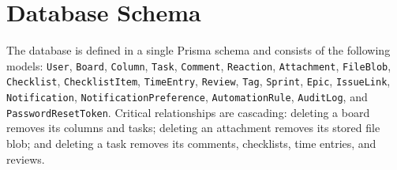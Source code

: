 \documentclass[12pt,a4paper]{report}
\begin{document}
\section{Database Schema}
\begin{sloppypar}
The database is defined in a single Prisma schema and consists of the following
models: \texttt{User}, \texttt{Board}, \texttt{Column}, \texttt{Task},
\texttt{Comment}, \texttt{Reaction}, \texttt{Attachment}, \texttt{FileBlob},
\texttt{Checklist}, \texttt{ChecklistItem}, \texttt{TimeEntry}, \texttt{Review},
\texttt{Tag}, \texttt{Sprint}, \texttt{Epic}, \texttt{IssueLink},
\texttt{Notification}, \texttt{NotificationPreference}, \texttt{AutomationRule},
\texttt{AuditLog}, and \texttt{PasswordResetToken}. Critical relationships are
cascading: deleting a board removes its columns and tasks; deleting an attachment
removes its stored file blob; and deleting a task removes its comments,
checklists, time entries, and reviews.
\end{sloppypar}
\end{document}
